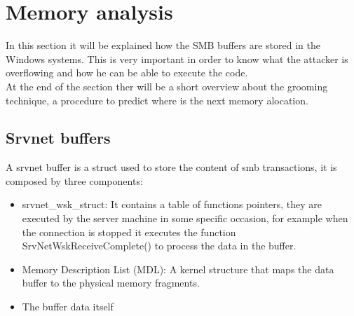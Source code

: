 \section{Memory analysis}
In this section it will be explained how the SMB buffers are stored in the Windows systems. This is very important in order to know 
what the attacker is overflowing and how he can be able to execute the code.\\
At the end of the section ther will be a short overview about the grooming technique, a procedure to predict where is the next memory alocation.
\subsection{Srvnet buffers}
A srvnet buffer is a struct used to store the content of smb transactions, it is composed by three components:
\begin{itemize}
    \item srvnet\_wsk\_struct: It contains a table of functions pointers, they are executed by the server machine in some specific occasion, for example
    when the connection is stopped it executes the function SrvNetWskReceiveComplete() to process the data in the buffer.
    \item Memory Description List (MDL): A kernel structure that maps the data buffer to the physical memory fragments.
    \item The buffer data itself
\end{itemize}

